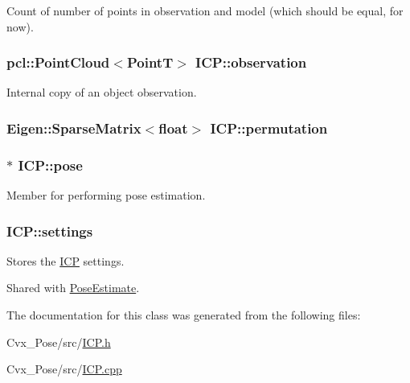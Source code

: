 \-Count of number of points in observation and model (which should be equal, for now). 

\hypertarget{classICP_a92b2b3089759aad730cb92a0976aea1b}{
\subsubsection[{observation}]{\setlength{\rightskip}{0pt plus 5cm}pcl\-::\-Point\-Cloud$<${\bf \-Point\-T}$>$ {\bf \-I\-C\-P\-::observation}}}\label{classICP_a92b2b3089759aad730cb92a0976aea1b}


\-Internal copy of an object observation. 

\hypertarget{classICP_aade0504cb0e1d5abcb2c2add2be606b1}{
\subsubsection[{permutation}]{\setlength{\rightskip}{0pt plus 5cm}\-Eigen\-::\-Sparse\-Matrix$<$float$>$ {\bf \-I\-C\-P\-::permutation}}}\label{classICP_aade0504cb0e1d5abcb2c2add2be606b1}
\hypertarget{classICP_a09c458b7e1daa98c6cc98177003794ce}{
\subsubsection[{pose}]{$\ast$ {\bf \-I\-C\-P\-::pose}}}\label{classICP_a09c458b7e1daa98c6cc98177003794ce}


\-Member for performing pose estimation. 

\hypertarget{classICP_a7e3065919f63c9bdc0ff0677b5cf56d0}{
\subsubsection[{settings}]{ {\bf \-I\-C\-P\-::settings}}}\label{classICP_a7e3065919f63c9bdc0ff0677b5cf56d0}


\-Stores the \hyperlink{classICP}{\-I\-C\-P} settings. 

\-Shared with \hyperlink{classPoseEstimate}{\-Pose\-Estimate}. 

\-The documentation for this class was generated from the following files\-:\begin{DoxyCompactItemize}
\item 
\-Cvx\-\_\-\-Pose/src/\hyperlink{ICP_8h}{\-I\-C\-P.\-h}\item 
\-Cvx\-\_\-\-Pose/src/\hyperlink{ICP_8cpp}{\-I\-C\-P.\-cpp}\end{DoxyCompactItemize}
